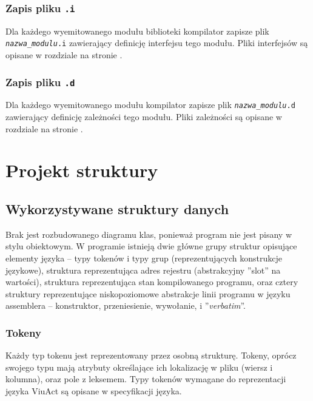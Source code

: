\documentclass[11pt,oneside,a4paper,titlepage,onecolumn]{article}
\begin{document}
\subsubsection{Zapis pliku \texttt{.i}}

Dla każdego wyemitowanego modułu biblioteki kompilator zapisze plik \texttt{\emph{nazwa\_modulu}.i}
zawierający definicję interfejsu tego modułu. Pliki interfejsów są opisane w rozdziale
 na stronie \pageref{pliki_interfejsow_modulow}.

\subsubsection{Zapis pliku \texttt{.d}}

Dla każdego wyemitowanego modułu kompilator zapisze plik \texttt{\emph{nazwa\_modulu}.d}
zawierający definicję zależności tego modułu. Pliki zależności są opisane w rozdziale
 na stronie \pageref{pliki_zaleznosci_modulow}.

\newpage
\section{Projekt struktury}

\subsection{Wykorzystywane struktury danych}

Brak jest rozbudowanego diagramu klas, ponieważ program nie jest pisany w stylu obiektowym.
W programie istnieją dwie główne grupy struktur opisujące elementy języka -- typy tokenów i typy grup
(reprezentujących konstrukcje językowe), struktura reprezentująca adres rejestru (abstrakcyjny ''slot'' na
wartości), struktura reprezentująca stan kompilowanego programu, oraz cztery struktury reprezentujące
niskopoziomowe abstrakcje linii programu w języku assemblera -- konstruktor, przeniesienie, wywołanie, i
''\emph{verbatim}''.

\subsubsection{Tokeny}
\label{diagram_klas_tokeny}

Każdy typ tokenu jest reprezentowany przez osobną strukturę. Tokeny, oprócz swojego typu mają atrybuty
określające ich lokalizację w pliku (wiersz i kolumna), oraz pole z leksemem. Typy tokenów wymagane do
reprezentacji języka ViuAct są opisane w specyfikacji języka.
\end{document}
